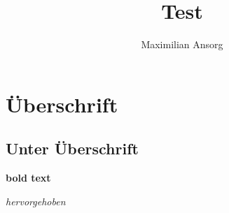 \documentclass[12pt,a4paper,parskip]{scrreprt}
\title{Test}
\author{Maximilian Ansorg}
\begin{document}
\maketitle

\tableofcontents

\section{Überschrift}

\subsection*{Unter Überschrift}
    
    \textbf{bold text}
    
    \emph{hervorgehoben}
\end{document}
